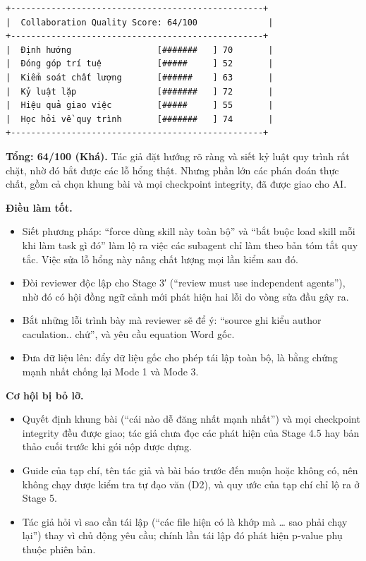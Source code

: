 \documentclass[12pt,a4paper]{article}
\providecommand{\tightlist}{\setlength{\itemsep}{0pt}\setlength{\parskip}{0pt}}
\begin{document}
\begin{verbatim}
+--------------------------------------------------+
|  Collaboration Quality Score: 64/100              |
+--------------------------------------------------+
|  Định hướng                 [#######   ] 70       |
|  Đóng góp trí tuệ           [#####     ] 52       |
|  Kiểm soát chất lượng       [######    ] 63       |
|  Kỷ luật lặp                [#######   ] 72       |
|  Hiệu quả giao việc         [#####     ] 55       |
|  Học hỏi về quy trình       [#######   ] 74       |
+--------------------------------------------------+
\end{verbatim}

\textbf{Tổng: 64/100 (Khá).} Tác giả đặt hướng rõ ràng và siết kỷ luật
quy trình rất chặt, nhờ đó bắt được các lỗ hổng thật. Nhưng phần lớn các
phán đoán thực chất, gồm cả chọn khung bài và mọi checkpoint integrity,
đã được giao cho AI.

\textbf{Điều làm tốt.}

\begin{itemize}
\tightlist
\item
  Siết phương pháp: ``force dùng skill này toàn bộ'' và ``bắt buộc load
  skill mỗi khi làm task gì đó'' làm lộ ra việc các subagent chỉ làm
  theo bản tóm tắt quy tắc. Việc sửa lỗ hổng này nâng chất lượng mọi lần
  kiểm sau đó.
\item
  Đòi reviewer độc lập cho Stage 3′ (``review must use independent
  agents''), nhờ đó có hội đồng ngữ cảnh mới phát hiện hai lỗi do vòng
  sửa đầu gây ra.
\item
  Bắt những lỗi trình bày mà reviewer sẽ để ý: ``source ghi kiểu author
  caculation.. chứ'', và yêu cầu equation Word gốc.
\item
  Đưa dữ liệu lên: đẩy dữ liệu gốc cho phép tái lập toàn bộ, là bằng
  chứng mạnh nhất chống lại Mode 1 và Mode 3.
\end{itemize}

\textbf{Cơ hội bị bỏ lỡ.}

\begin{itemize}
\tightlist
\item
  Quyết định khung bài (``cái nào dễ đăng nhất mạnh nhất'') và mọi
  checkpoint integrity đều được giao; tác giả chưa đọc các phát hiện của
  Stage 4.5 hay bản thảo cuối trước khi gói nộp được dựng.
\item
  Guide của tạp chí, tên tác giả và bài báo trước đến muộn hoặc không
  có, nên không chạy được kiểm tra tự đạo văn (D2), và quy ước của tạp
  chí chỉ lộ ra ở Stage 5.
\item
  Tác giả hỏi vì sao cần tái lập (``các file hiện có là khớp mà \ldots{}
  sao phải chạy lại'') thay vì chủ động yêu cầu; chính lần tái lập đó
  phát hiện p-value phụ thuộc phiên bản.
\end{itemize}
\end{document}
